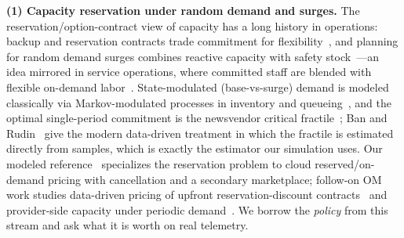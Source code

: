 \documentclass[10pt,journal]{IEEEtran}
\begin{document}
\textbf{(1) Capacity reservation under random demand and surges.}
The reservation/option-contract view of capacity has a long history in
operations: backup and reservation contracts trade commitment for
flexibility~\cite{eppen1997backup,erkoc2005reservation}, and planning for
random demand surges combines reactive capacity with safety
stock~\cite{huang2016surges}---an idea mirrored in service operations, where
committed staff are blended with flexible on-demand
labor~\cite{dong2020ondemand}. State-modulated (base-vs-surge) demand is
modeled classically via Markov-modulated processes in inventory and
queueing~\cite{songzipkin1993,fischer1993mmpp}, and the
optimal single-period commitment is the newsvendor critical
fractile~\cite{arrow1951inventory}; Ban and Rudin~\cite{ban2019newsvendor}
give the modern data-driven treatment in which the fractile is estimated
directly from samples, which is exactly the estimator our simulation uses.
Our modeled reference~\cite{chen2024capacity} specializes the reservation
problem to cloud reserved/on-demand pricing with cancellation and a secondary
marketplace; follow-on OM work studies data-driven pricing of upfront
reservation-discount contracts~\cite{huang2025reservation} and provider-side
capacity under periodic demand~\cite{furman2025capacity}. We borrow the \emph{policy} from
this stream and ask what it is worth on real telemetry.
\end{document}
